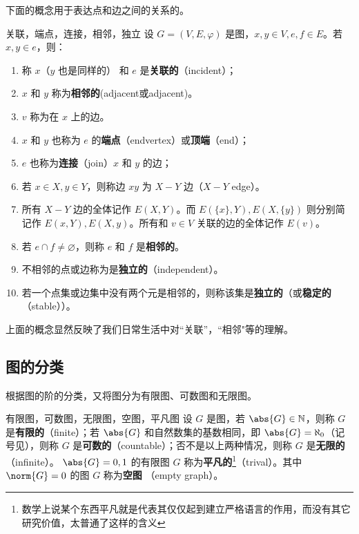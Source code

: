 下面的概念用于表达点和边之间的关系的。
\begin{definition}{关联，端点，连接，相邻，独立}
设 $G=(V,E,\varphi)$ 是图，$x,y\in V,e,f\in E$。若 $x,y\in e$，则：

 \begin{enumerate}
 \item 称 $x$（$y$ 也是同样的） 和 $e$ 是\textbf{关联的}（incident）；

   \item  $x$ 和 $y$ 称为\textbf{相邻的}(adjacent或adjacent)。

   \item $v$ 称为在 $x$ 上的边。
  
   \item $x$ 和 $y$ 也称为 $e$ 的\textbf{端点}（endvertex）或\textbf{顶端}（end）；
  
  \item  $e$ 也称为\textbf{连接}（join）$x$ 和 $y$ 的边；
  
   \item 若 $x\in X,y\in Y$，则称边 $xy$ 为 $X-Y$ 边（$X-Y$ edge）。
  
   \item 所有 $X-Y$ 边的全体记作 $E(X,Y)$。而 $E(\{x\},Y),E(X,\{y\})$ 则分别简记作 $E(x,Y),E(X,y)$。所有和 $v\in V$ 关联的边的全体记作 $E(v)$。

   \item 若 $e\cap f\neq\varnothing$，则称 $e$ 和 $f$ 是\textbf{相邻的}。

   \item 不相邻的点或边称为是\textbf{独立的}（independent）。
   
   \item 若一个点集或边集中没有两个元是相邻的，则称该集是\textbf{独立的}（或\textbf{稳定的}（stable））。
 \end{enumerate}
\end{definition}
上面的概念显然反映了我们日常生活中对“关联”，“相邻"等的理解。

\subsection{图的分类}
根据图的阶的分类，又将图分为有限图、可数图和无限图。
\begin{definition}{有限图，可数图，无限图，空图，平凡图}
设 $G$ 是图，若 $\abs{G}\in\mathbb N$，则称 $G$ 是\textbf{有限的}（finite）；若 $\abs{G}$ 和自然数集的基数相同，即 $\abs{G}=\aleph_0$（记号见），则称 $G$ 是\textbf{可数的}（countable）；否不是以上两种情况，则称 $G$ 是\textbf{无限的}（infinite）。 $\abs{G}=0,1$ 的有限图 $G$ 称为\textbf{平凡的}\footnote{数学上说某个东西平凡就是代表其仅仅起到建立严格语言的作用，而没有其它研究价值，太普通了这样的含义}（trival）。其中 $\norm{G}=0$ 的图 $G$ 称为\textbf{空图} （empty graph）。 
\end{definition}

